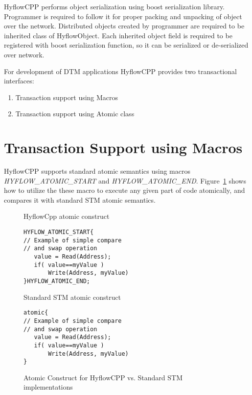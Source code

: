 \documentclass[12pt,english]{report}
\begin{document}
HyflowCPP performs object serialization using boost serialization library. Programmer is required to follow it for proper packing and unpacking of object over the network. Distributed objects created by programmer are required to be inherited class of HyflowObject. Each inherited object field is required to be registered with boost serialization function, so it can be serialized or de-serialized over network.

For development of DTM applications HyflowCPP provides two transactional interfaces: 
\begin{enumerate}
\item Transaction support using Macros
\item Transaction support using Atomic class 
\end{enumerate}

\section{Transaction Support using Macros}

HyflowCPP supports standard atomic semantics using macros \emph{HYFLOW{\_}ATOMIC{\_}START} and \emph{HYFLOW{\_}ATOMIC{\_}END}. Figure~\ref{Fig:atomicConstr} shows how to utilize the these macro to execute any given part of code atomically, and compares it with standard STM atomic semantics. 

\begin{figure}
\centering 
\begin{footnotesize}
\begin{minipage}[b]{0.45\linewidth}\centering
HyflowCpp atomic construct 
\begin{lstlisting}
HYFLOW_ATOMIC_START{
// Example of simple compare
// and swap operation
   value = Read(Address);
   if( value==myValue )
       Write(Address, myValue)
}HYFLOW_ATOMIC_END;
\end{lstlisting} 
\end{minipage} 
\begin{minipage}[b]{0.45\linewidth}\centering
Standard STM atomic construct
\begin{lstlisting}   					   
atomic{
// Example of simple compare
// and swap operation
   value = Read(Address);
   if( value==myValue )
       Write(Address, myValue)
}
\end{lstlisting}			  
\end{minipage}
\end{footnotesize}
\label{Fig:atomicConstr}\caption{Atomic Construct for HyflowCPP vs. Standard STM implementations}
\end{figure}
\end{document}
